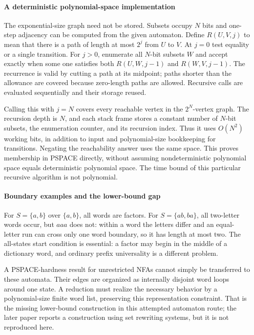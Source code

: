 \documentclass[11pt]{article}
\begin{document}
\paragraph{A deterministic polynomial-space implementation}
The exponential-size graph need not be stored. Subsets occupy $N$ bits and one-step adjacency can be computed from the given automaton. Define $R(U,V,j)$ to mean that there is a path of length at most $2^j$ from $U$ to $V$. At $j=0$ test equality or a single transition. For $j>0$, enumerate all $N$-bit subsets $W$ and accept exactly when some one satisfies both $R(U,W,j-1)$ and $R(W,V,j-1)$. The recurrence is valid by cutting a path at its midpoint; paths shorter than the allowance are covered because zero-length paths are allowed. Recursive calls are evaluated sequentially and their storage reused.

Calling this with $j=N$ covers every reachable vertex in the $2^N$-vertex graph. The recursion depth is $N$, and each stack frame stores a constant number of $N$-bit subsets, the enumeration counter, and its recursion index. Thus it uses $O(N^2)$ working bits, in addition to input and polynomial-size bookkeeping for transitions. Negating the reachability answer uses the same space. This proves membership in PSPACE directly, without assuming nondeterministic polynomial space equals deterministic polynomial space. The time bound of this particular recursive algorithm is not polynomial.

\paragraph{Boundary examples and the lower-bound gap}
For $S=\{a,b\}$ over $\{a,b\}$, all words are factors. For $S=\{ab,ba\}$, all two-letter words occur, but $aaa$ does not: within a word the letters differ and an equal-letter run can cross only one word boundary, so it has length at most two. The all-states start condition is essential: a factor may begin in the middle of a dictionary word, and ordinary prefix universality is a different problem.

A PSPACE-hardness result for unrestricted NFAs cannot simply be transferred to these automata. Their edges are organized as internally disjoint word loops around one state. A reduction must realize the necessary behavior by a polynomial-size finite word list, preserving this representation constraint. That is the missing lower-bound construction in this attempted automaton route; the later paper reports a construction using set rewriting systems, but it is not reproduced here.
\end{document}
